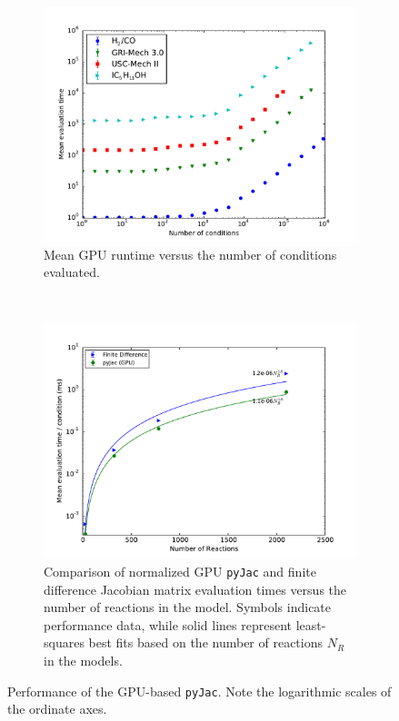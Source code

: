 \documentclass[preprint,12pt]{elsarticle}
\begin{document}
{\begin{figure}[tbp]
    \centering
    \begin{subfigure}{0.75\textwidth}
        \centering
        \includegraphics[width=\textwidth]{gpu.pdf}
        \caption{Mean GPU runtime versus the number of conditions evaluated.}
        \label{F:gpu_mean}
    \end{subfigure}%
    \\
    \begin{subfigure}{0.75\textwidth}
        \centering
        \includegraphics[width=\textwidth]{gpu_norm.pdf}
        \caption{Comparison of normalized GPU \texttt{pyJac} and finite difference Jacobian matrix evaluation times versus the number of reactions in the model. Symbols indicate performance data, while solid lines represent least-squares best fits based on the number of reactions $N_R$ in the models.}
        \label{F:gpu_norm}
    \end{subfigure}
    \caption{Performance of the GPU-based \texttt{pyJac}.
    Note the logarithmic scales of the ordinate axes.}
    \label{F:gpu_perf}
\end{figure}

}
\end{document}
